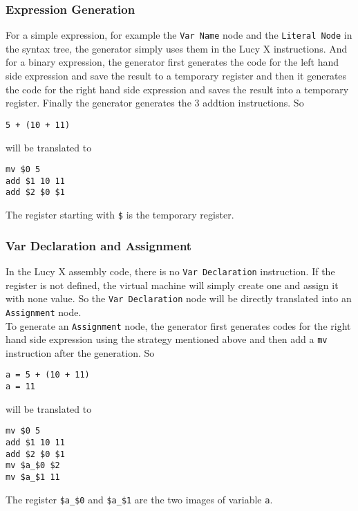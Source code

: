 \subsubsection{Expression Generation}
For a simple expression, for example the \texttt{Var Name} node and the \texttt{Literal Node} in the syntax tree, the generator simply uses them in the Lucy X instructions. And for a binary expression, the generator first generates the code for the left hand side expression and save the result to a temporary register and then it generates the code for the right hand side expression and saves the result into a temporary register. Finally the generator generates the 3 addtion instructions. So
\begin{lstlisting}
5 + (10 + 11)
\end{lstlisting}
will be translated to
\begin{lstlisting}[language=LucyX]
mv $0 5
add $1 10 11
add $2 $0 $1
\end{lstlisting}
The register starting with \texttt{\$} is the temporary register.
\subsubsection{Var Declaration and Assignment}
In the Lucy X assembly code, there is no \texttt{Var Declaration} instruction. If the register is not defined, the virtual machine will simply create one and assign it with none value. So the \texttt{Var Declaration} node will be directly translated into an \texttt{Assignment} node. \\
To generate an \texttt{Assignment} node, the generator first generates codes for the right hand side expression using the strategy mentioned above and then add a \texttt{mv} instruction after the generation. So
\begin{lstlisting}
a = 5 + (10 + 11)
a = 11
\end{lstlisting}
will be translated to
\begin{lstlisting}[language=LucyX]
mv $0 5
add $1 10 11
add $2 $0 $1
mv $a_$0 $2
mv $a_$1 11
\end{lstlisting}
The register \texttt{\$a\_\$0} and \texttt{\$a\_\$1} are the two images of variable \texttt{a}.
